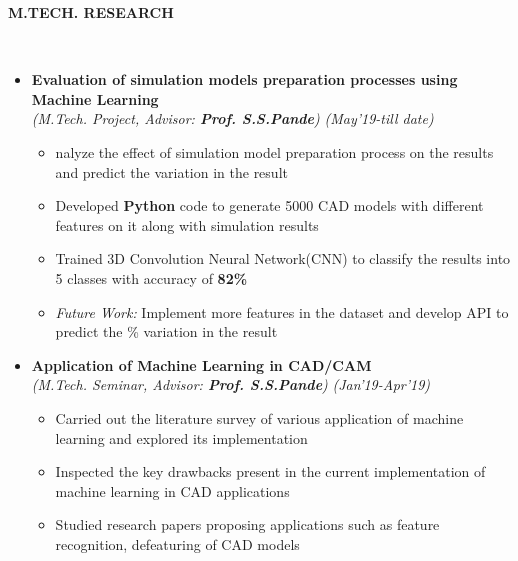 \documentclass[a4paper,10pt]{article}
\newcommand{\resheading}[1]{{\small \colorbox{mygrey}{\begin{minipage}{0.99\textwidth}{\textbf{#1 \vphantom{p\^{E}}}}\end{minipage}}}}
\begin{document}
\noindent
\resheading{\textbf{M.TECH. RESEARCH}}\\[-0.5cm]
\begin{itemize}%

\item \textbf{Evaluation of simulation models preparation processes using Machine Learning}\\
\emph{(M.Tech. Project, Advisor: \textbf{Prof. S.S.Pande})} \hfill \emph{(May'19-till date)}
	\begin{itemize}[noitemsep,nolistsep]
	\item nalyze the effect of simulation model preparation process on the results and predict the variation in the result
	\item Developed \textbf{Python} code to generate 5000 CAD models with different features on it along with simulation results
	\item Trained 3D Convolution Neural Network(CNN) to classify the results into 5 classes with accuracy of \textbf{82\%}   
	\item \textit{Future Work:} Implement more features in the dataset and develop API to predict the \% variation in the result
    \end{itemize}
    
\item \textbf{Application of Machine Learning in CAD/CAM} \\
\emph{(M.Tech. Seminar, Advisor: \textbf{Prof. S.S.Pande})} \hfill \emph{(Jan'19-Apr'19)}
	\begin{itemize}[noitemsep,nolistsep]
    \item Carried out the literature survey of various application of machine learning and explored its implementation %
    \item Inspected the key drawbacks present in the current implementation of machine learning in CAD applications
    \item Studied research papers proposing applications such as feature recognition, defeaturing of CAD models
	\end{itemize}
\end{itemize}
\end{document}
